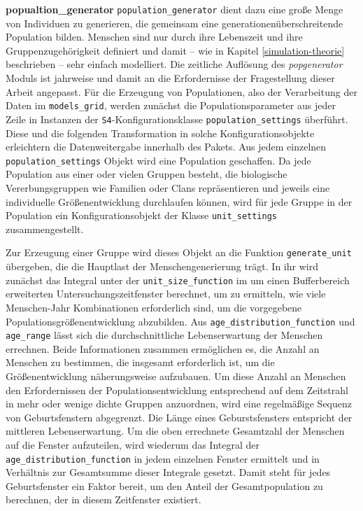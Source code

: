\documentclass[openany,twoside,twocolumn]{book}
\begin{document}
\textbf{popualtion\_generator} \newline  \texttt{population\_generator}
dient dazu eine große Menge von Individuen zu generieren, die gemeinsam
eine generationenüberschreitende Population bilden. Menschen sind nur
durch ihre Lebenszeit und ihre Gruppenzugehörigkeit definiert und damit
-- wie in Kapitel \ref{simulation-theorie} beschrieben -- sehr einfach
modelliert. Die zeitliche Auflösung des \emph{popgenerator} Moduls ist
jahrweise und damit an die Erfordernisse der Fragestellung dieser Arbeit
angepasst. Für die Erzeugung von Populationen, also der Verarbeitung der
Daten im \texttt{models\_grid}, werden zunächst die Populationsparameter
aus jeder Zeile in Instanzen der \texttt{S4}-Konfigurationsklasse
\texttt{population\_settings} überführt. Diese und die folgenden
Transformation in solche Konfigurationsobjekte erleichtern die
Datenweitergabe innerhalb des Pakets. Aus jedem einzelnen
\texttt{population\_settings} Objekt wird eine Population geschaffen. Da
jede Population aus einer oder vielen Gruppen besteht, die biologische
Vererbungsgruppen wie Familien oder Clans repräsentieren und jeweils
eine individuelle Größenentwicklung durchlaufen können, wird für jede
Gruppe in der Population ein Konfigurationsobjekt der Klasse
\texttt{unit\_settings} zusammengestellt.

Zur Erzeugung einer Gruppe wird dieses Objekt an die Funktion
\texttt{generate\_unit} übergeben, die die Hauptlast der
Menschengenerierung trägt. In ihr wird zunächst das Integral unter der
\texttt{unit\_size\_function} im um einen Bufferbereich erweiterten
Untersuchungszeitfenster berechnet, um zu ermitteln, wie viele
Menschen-Jahr Kombinationen erforderlich sind, um die vorgegebene
Populationsgrößenentwicklung abzubilden. Aus
\texttt{age\_distribution\_function} und \texttt{age\_range} lässt sich
die durchschnittliche Lebenserwartung der Menschen errechnen. Beide
Informationen zusammen ermöglichen es, die Anzahl an Menschen zu
bestimmen, die insgesamt erforderlich ist, um die Größenentwicklung
näherungsweise aufzubauen. Um diese Anzahl an Menschen den
Erfordernissen der Populationsentwicklung entsprechend auf dem
Zeitstrahl in mehr oder wenige dichte Gruppen anzuordnen, wird eine
regelmäßige Sequenz von Geburtsfenstern abgegrenzt. Die Länge eines
Geburstsfensters entspricht der mittleren Lebenserwartung. Um die oben
errechnete Gesamtzahl der Menschen auf die Fenster aufzuteilen, wird
wiederum das Integral der \texttt{age\_distribution\_function} in jedem
einzelnen Fenster ermittelt und in Verhältnis zur Gesamtsumme dieser
Integrale gesetzt. Damit steht für jedes Geburtsfenster ein Faktor
bereit, um den Anteil der Gesamtpopulation zu berechnen, der in diesem
Zeitfenster existiert.
\end{document}
